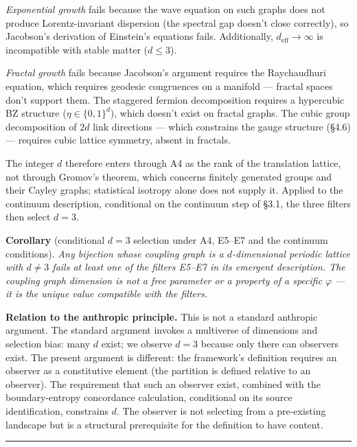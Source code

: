 \documentclass[
]{article}
\begin{document}
\emph{Exponential growth} fails because the wave equation on such graphs
does not produce Lorentz-invariant dispersion (the spectral gap doesn't
close correctly), so Jacobson's derivation of Einstein's equations
fails. Additionally, \(d_{\text{eff}} \to \infty\) is incompatible with
stable matter (\(d \leq 3\)).

\emph{Fractal growth} fails because Jacobson's argument requires the
Raychaudhuri equation, which requires geodesic congruences on a manifold
--- fractal spaces don't support them. The staggered fermion
decomposition requires a hypercubic BZ structure
(\(\eta \in \{0,1\}^d\)), which doesn't exist on fractal graphs. The
cubic group decomposition of \(2d\) link directions --- which constrains
the gauge structure (§4.6) --- requires cubic lattice symmetry, absent
in fractals.

The integer \(d\) therefore enters through A4 as the rank of the
translation lattice, not through Gromov's theorem, which concerns
finitely generated groups and their Cayley graphs; statistical isotropy
alone does not supply it. Applied to the continuum description,
conditional on the continuum step of §3.1, the three filters then select
\(d = 3\).

\textbf{Corollary} (conditional \(d = 3\) selection under A4, E5--E7 and
the continuum conditions). \emph{Any bijection whose coupling graph is a
\(d\)-dimensional periodic lattice with \(d \neq 3\) fails at least one
of the filters E5--E7 in its emergent description. The coupling graph
dimension is not a free parameter or a property of a specific
\(\varphi\) --- it is the unique value compatible with the filters.}

\textbf{Relation to the anthropic principle.} This is not a standard
anthropic argument. The standard argument invokes a multiverse of
dimensions and selection bias: many \(d\) exist; we observe \(d = 3\)
because only there can observers exist. The present argument is
different: the framework's definition requires an observer as a
constitutive element (the partition is defined relative to an observer).
The requirement that such an observer exist, combined with the
boundary-entropy concordance calculation, conditional on its source
identification, constrains \(d\). The observer is not selecting from a
pre-existing landscape but is a structural prerequisite for the
definition to have content.

\begin{center}\rule{0.5\linewidth}{0.5pt}\end{center}
\end{document}
